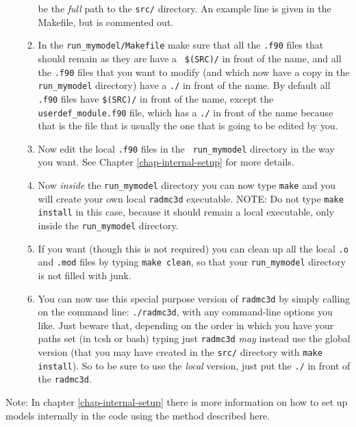 \documentclass{report}
\begin{document}
\begin{itemize}
\begin{enumerate}
  be the {\em full} path to the {\small\tt src/} directory. An example line
  is given in the Makefile, but is commented out.
\item In the {\small\tt run\_mymodel/Makefile} make sure that all the
  {\small\tt .f90} files that should remain as they are have a {\small\tt
    \$(SRC)/} in front of the name, and all the {\small\tt .f90} files that
  you want to modify (and which now have a copy in the {\small\tt
    run\_mymodel} directory) have a {\small\tt ./} in front of the name. By
  default all {\small\tt .f90} files have {\small\tt \$(SRC)/} in front of
  the name, except the {\small\tt userdef\_module.f90} file, which has a
  {\small\tt ./} in front of the name because that is the file that is
  usually the one that is going to be edited by you.
\item Now edit the local {\small\tt .f90} files in the {\small\tt
    run\_mymodel} directory in the way you want. See Chapter \ref{chap-internal-setup} for more details.
\item Now {\em inside} the {\small\tt run\_mymodel} directory you can now type
  {\small\tt make} and you will create your own local {\small\tt radmc3d} executable.
  NOTE: Do not type {\small\tt make install} in this case, because it should
  remain a local executable, only inside the {\small\tt run\_mymodel} directory.
\item If you want (though this is not required) you can clean up all the
  local {\small\tt .o} and {\small\tt .mod} files by typing {\small\tt make
    clean}, so that your {\small\tt run\_mymodel} directory is not filled
  with junk.
\item You can now use this special purpose version of {\small\tt radmc3d}
  by simply calling on the command line: {\small\tt ./radmc3d}, with any
  command-line options you like. Just beware that, depending on the order
  in which you have your paths set (in tcsh or bash) typing just 
  {\small\tt radmc3d} {\em may} instead use the global version (that you
  may have created in the {\small\tt src/} directory with {\small\tt make
    install}). So to be sure to use the {\em local} version, just put the
  {\small\tt ./} in front of the {\small\tt radmc3d}.
\end{enumerate}
\end{itemize}

Note: In chapter \ref{chap-internal-setup} there is more information on
how to set up models internally in the code using the method described
here.
\end{document}
